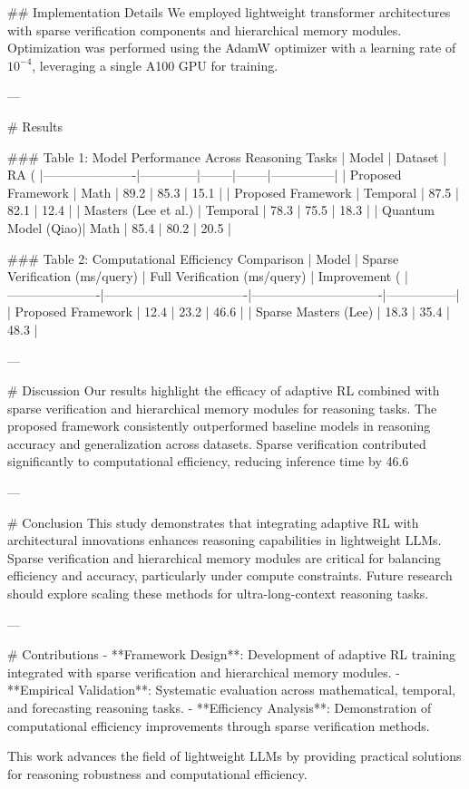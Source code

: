 ## Implementation Details  
We employed lightweight transformer architectures with sparse verification components and hierarchical memory modules. Optimization was performed using the AdamW optimizer with a learning rate of \(10^{-4}\), leveraging a single A100 GPU for training.

---

# Results  

### Table 1: Model Performance Across Reasoning Tasks  
| Model                | Dataset      | RA (%
|----------------------|--------------|--------|--------|---------------|  
| Proposed Framework   | Math         | 89.2   | 85.3   | 15.1          |  
| Proposed Framework   | Temporal     | 87.5   | 82.1   | 12.4          |  
| Masters (Lee et al.) | Temporal     | 78.3   | 75.5   | 18.3          |  
| Quantum Model (Qiao)| Math         | 85.4   | 80.2   | 20.5          |  

### Table 2: Computational Efficiency Comparison  
| Model                | Sparse Verification (ms/query) | Full Verification (ms/query) | Improvement (%
|----------------------|----------------------------------|-------------------------------|-----------------|  
| Proposed Framework   | 12.4                           | 23.2                          | 46.6            |  
| Sparse Masters (Lee) | 18.3                           | 35.4                          | 48.3            |  

---

# Discussion  
Our results highlight the efficacy of adaptive RL combined with sparse verification and hierarchical memory modules for reasoning tasks. The proposed framework consistently outperformed baseline models in reasoning accuracy and generalization across datasets. Sparse verification contributed significantly to computational efficiency, reducing inference time by 46.6%

---

# Conclusion  
This study demonstrates that integrating adaptive RL with architectural innovations enhances reasoning capabilities in lightweight LLMs. Sparse verification and hierarchical memory modules are critical for balancing efficiency and accuracy, particularly under compute constraints. Future research should explore scaling these methods for ultra-long-context reasoning tasks.

---

# Contributions  
- **Framework Design**: Development of adaptive RL training integrated with sparse verification and hierarchical memory modules.  
- **Empirical Validation**: Systematic evaluation across mathematical, temporal, and forecasting reasoning tasks.  
- **Efficiency Analysis**: Demonstration of computational efficiency improvements through sparse verification methods.  

This work advances the field of lightweight LLMs by providing practical solutions for reasoning robustness and computational efficiency.